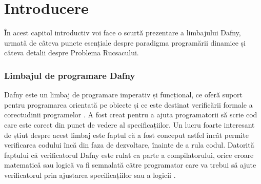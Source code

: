 \chapter*{Introducere} 

\begin{sloppypar}
În acest capitol introductiv voi face o scurtă prezentare a limbajului Dafny, urmată de câteva puncte esențiale despre paradigma programării dinamice și câteva detalii despre Problema Rucsacului.

\subsection*{Limbajul de programare Dafny}
Dafny este un limbaj de programare imperativ și funcțional, ce oferă suport pentru programarea orientată pe obiecte și ce este destinat verificării formale a corectudinii programelor \cite{enwiki:1265861302}. A fost creat pentru a ajuta programatorii să scrie cod care este corect din punct de vedere al specificațiilor. Un lucru foarte interesant de știut despre acest limbaj este faptul că a fost conceput astfel încât permite verificarea codului încă din faza de dezvoltare, înainte de a rula codul. Datorită faptului că verificatorul Dafny este rulat ca parte a compilatorului, orice eroare matematică sau logică va fi semnalată către programator care va trebui să ajute verificatorul prin ajustarea specificațiilor sau a logicii \cite{leino2021dafny}.


\end{sloppypar}
